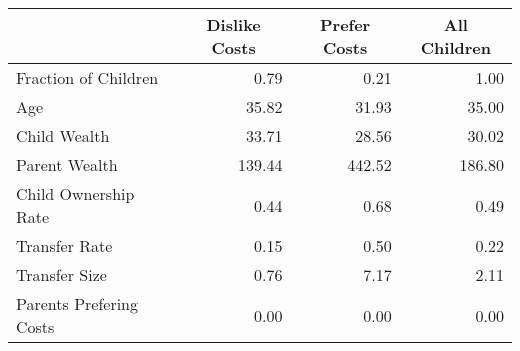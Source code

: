 \begin{tabular}{l rrr}
\toprule
  &  \multicolumn{1}{c}{Dislike Costs } & \multicolumn{1}{c}{Prefer Costs } & \multicolumn{1}{c}{All Children}\\
\midrule
Fraction of Children & 0.79 & 0.21 & 1.00\\
Age & 35.82 & 31.93 & 35.00\\
Child Wealth & 33.71 & 28.56 & 30.02\\
Parent Wealth & 139.44 & 442.52 & 186.80\\
Child Ownership Rate & 0.44 & 0.68 & 0.49\\
Transfer Rate & 0.15 & 0.50 & 0.22\\
Transfer Size & 0.76 & 7.17 & 2.11\\
Parents Prefering Costs & 0.00 & 0.00 & 0.00\\
\bottomrule
\end{tabular}
